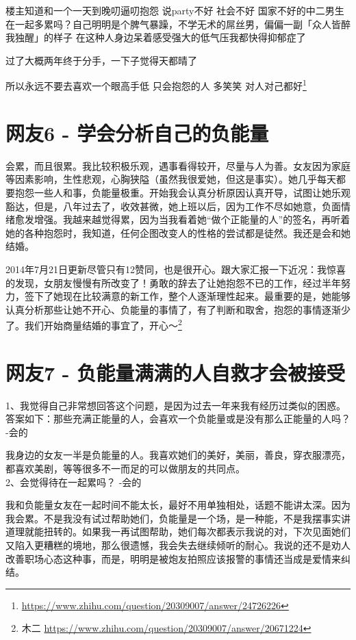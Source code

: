 楼主知道和一个一天到晚叨逼叨抱怨 说party不好 社会不好 国家不好的中二男生在一起多累吗？自己明明是个脾气暴躁，不学无术的屌丝男，偏偏一副「众人皆醉我独醒」的样子 在这种人身边呆着感受强大的低气压我都快得抑郁症了

过了大概两年终于分手，一下子觉得天都晴了

所以永远不要去喜欢一个眼高手低 只会抱怨的人 多笑笑 对人对己都好\footnote{\url{https://www.zhihu.com/question/20309007/answer/24726226}}

\section{网友6 - 学会分析自己的负能量}

会累，而且很累。我比较积极乐观，遇事看得较开，尽量与人为善。女友因为家庭等因素影响，生性悲观，心胸狭隘（虽然我很爱她，但这是事实）。她几乎每天都要抱怨一些人和事，负能量极重。开始我会认真分析原因认真开导，试图让她乐观豁达，但是，八年过去了，收效甚微，她上班以后，因为工作不尽如她意，负面情绪愈发增强。我越来越觉得累，因为当我看着她“做个正能量的人”的签名，再听着她的各种抱怨时，我知道，任何企图改变人的性格的尝试都是徒然。我还是会和她结婚。

2014年7月21日更新尽管只有12赞同，也是很开心。跟大家汇报一下近况：我惊喜的发现，女朋友慢慢有所改变了！勇敢的辞去了让她抱怨不已的工作，经过半年努力，签下了她现在比较满意的新工作，整个人逐渐理性起来。最重要的是，她能够认真分析那些让她不开心、负能量的事情了，有了判断和取舍，抱怨的事情逐渐少了。我们开始商量结婚的事宜了，开心～\footnote{木二 \quad \url{https://www.zhihu.com/question/20309007/answer/20671224}}

\section{网友7 - 负能量满满的人自救才会被接受}

1、我觉得自己非常想回答这个问题，是因为过去一年来我有经历过类似的困惑。答案如下：那些充满正能量的人，会喜欢一个负能量或是没有那么正能量的人吗？ -会的

我身边的女友一半是负能量的人。我喜欢她们的美好，美丽，善良，穿衣服漂亮，都喜欢美剧，等等很多不一而足的可以做朋友的共同点。\\

2、会觉得待在一起累吗？ -会的

我和负能量女友在一起时间不能太长，最好不用单独相处，话题不能讲太深。因为我会累。不是我没有试过帮助她们，负能量是一个场，是一种能，不是我摆事实讲道理就能扭转的。如果我一再试图帮助，她们每次都表示我说的对，下次见面她们又陷入更糟糕的境地，那么很遗憾，我会失去继续倾听的耐心。我说的还不是劝人改善职场心态这种事，而是，明明是被炮友拍照应该报警的事情还当成是爱情来纠结。\\

